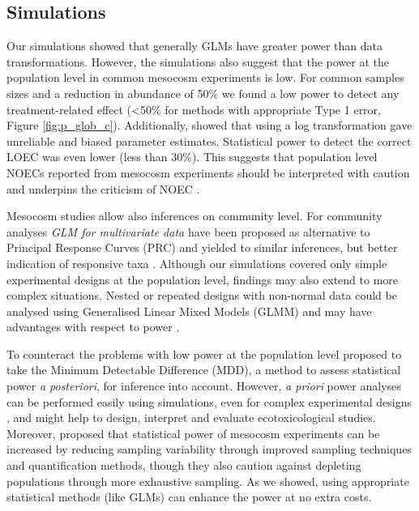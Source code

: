 \documentclass[twocolumn, natbib]{svjour3}
\begin{document}
\subsection{Simulations}
Our simulations showed that generally GLMs have greater power than data transformations.
However, the simulations also suggest that the power at the population level in common mesocosm experiments is low.
For common samples sizes and a reduction in abundance of 50\% we found a low power to detect any treatment-related effect (\textless 50\% for methods with appropriate Type 1 error, Figure \ref{fig:p_glob_c}).
Additionally, \citet{ohara_not_2010} showed that using a log transformation gave unreliable and biased parameter estimates.
Statistical power to detect the correct LOEC was even lower (less than 30\%).
This suggests that population level NOECs reported from mesocosm experiments should be interpreted with caution and underpins the criticism of NOEC \citep{laskowski_good_1995,landis_well_2011}.

Mesocosm studies allow also inferences on community level. 
For community analyses \emph{GLM for multivariate data} have been proposed as alternative to Principal Response Curves (PRC) and yielded to similar inferences, but better indication of responsive taxa \citep{warton_distance-based_2012,szocs_analysing_2015}. 
Although our simulations covered only simple experimental designs at the population level, findings may also extend to more complex situations. 
Nested or repeated designs with non-normal data could be analysed using Generalised Linear Mixed Models (GLMM) and may have advantages with respect to power \citep{stroup_rethinking_2014}.

To counteract the problems with low power at the population level \citet{brock_minimum_2015} proposed to take the Minimum Detectable Difference (MDD), a method to assess statistical power \emph{a posteriori}, for inference into account.
However, \emph{a priori} power analyses can be performed easily using simulations, even for complex experimental designs \citep{johnson_power_2014}, and might help to design, interpret and evaluate ecotoxicological studies.
Moreover, \citet{brock_minimum_2015} proposed that statistical power of mesocosm experiments can be increased by reducing sampling variability through improved sampling techniques and quantification methods, though they also caution against depleting populations through more exhaustive sampling.
As we showed, using appropriate statistical methods (like GLMs) can enhance the power at no extra costs.
\end{document}
